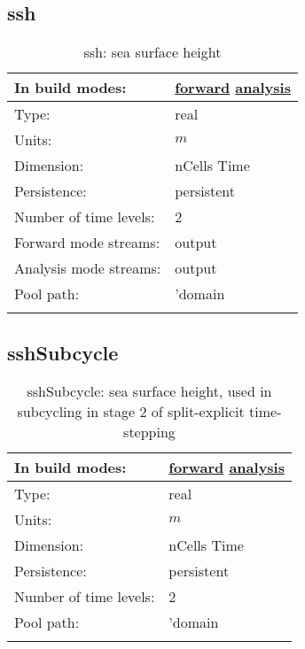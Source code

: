 \subsection[ssh]{ssh}
\label{subsec:var_sec_state_ssh}
\begin{center}
\begin{longtable}{| p{2.0in} | p{4.0in} |}
        \hline 
        In build modes: & \hyperref[subsec:forward_var_tab_state]{forward} \hyperref[subsec:analysis_var_tab_state]{analysis} \\
        \hline 
        Type: & real \\
        \hline 
        Units: & $m$ \\
        \hline 
        Dimension: & nCells Time \\
        \hline 
        Persistence: & persistent \\
        \hline 
        Number of time levels: & 2 \\
        \hline 
		 Forward mode streams: &  output \\
        \hline 
		 Analysis mode streams: &  output \\
        \hline 
            Pool path: & 'domain %
 \\
		 \hline 
    \caption{ssh: sea surface height}
\end{longtable}
\end{center}
\subsection[sshSubcycle]{sshSubcycle}
\label{subsec:var_sec_state_sshSubcycle}
\begin{center}
\begin{longtable}{| p{2.0in} | p{4.0in} |}
        \hline 
        In build modes: & \hyperref[subsec:forward_var_tab_state]{forward} \hyperref[subsec:analysis_var_tab_state]{analysis} \\
        \hline 
        Type: & real \\
        \hline 
        Units: & $m$ \\
        \hline 
        Dimension: & nCells Time \\
        \hline 
        Persistence: & persistent \\
        \hline 
        Number of time levels: & 2 \\
        \hline 
            Pool path: & 'domain %
 \\
		 \hline 
    \caption{sshSubcycle: sea surface height, used in subcycling in stage 2 of split-explicit time-stepping}
\end{longtable}
\end{center}
